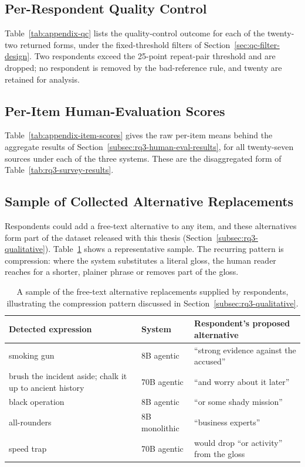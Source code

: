\subsection{Per-Respondent Quality Control}
\label{appendix:qc-table}

Table~\ref{tab:appendix-qc} lists the quality-control outcome for each of the twenty-two returned forms, under the fixed-threshold filters of Section~\ref{sec:qc-filter-design}. Two respondents exceed the 25-point repeat-pair threshold and are dropped; no respondent is removed by the bad-reference rule, and twenty are retained for analysis.



\subsection{Per-Item Human-Evaluation Scores}
\label{appendix:item-scores}

Table~\ref{tab:appendix-item-scores} gives the raw per-item means behind the aggregate results of Section~\ref{subsec:rq3-human-eval-results}, for all twenty-seven sources under each of the three systems. These are the disaggregated form of Table~\ref{tab:rq3-survey-results}.



\subsection{Sample of Collected Alternative Replacements}
\label{appendix:alternatives}

Respondents could add a free-text alternative to any item, and these alternatives form part of the dataset released with this thesis (Section~\ref{subsec:rq3-qualitative}). Table~\ref{tab:appendix-alternatives} shows a representative sample. The recurring pattern is compression: where the system substitutes a literal gloss, the human reader reaches for a shorter, plainer phrase or removes part of the gloss.

\begin{table}[h!]
\centering
\small
\begin{tabular}{p{3.4cm}lp{6.2cm}}
\hline
\textbf{Detected expression} & \textbf{System} & \textbf{Respondent's proposed alternative} \\
\hline
smoking gun & 8B agentic & ``strong evidence against the accused'' \\
brush the incident aside; chalk it up to ancient history & 70B agentic & ``and worry about it later'' \\
black operation & 8B agentic & ``or some shady mission'' \\
all-rounders & 8B monolithic & ``business experts'' \\
speed trap & 70B agentic & would drop ``or activity'' from the gloss \\
\hline
\end{tabular}
\caption{A sample of the free-text alternative replacements supplied by respondents, illustrating the compression pattern discussed in Section~\ref{subsec:rq3-qualitative}.}
\label{tab:appendix-alternatives}
\end{table}

\newpage
